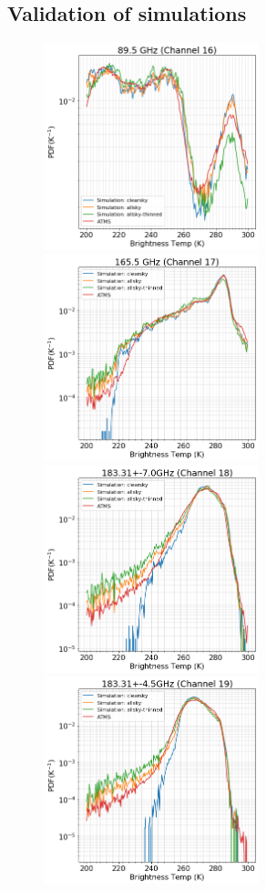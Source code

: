 \documentclass[12pt]{article}
\begin{document}
\subsection{Validation of simulations}
\label{sec:validation}
%
\begin{figure}[p]
	\centering
	\includegraphics[height=60mm]{ATMS_C16_distribution}\hspace{5mm}%
	\includegraphics[height=60mm]{ATMS_C17_distribution}
	\includegraphics[height=60mm]{ATMS_C18_distribution}\hspace{5mm}%
	\includegraphics[height=60mm]{ATMS_C19_distribution}

\end{figure}
\end{document}
